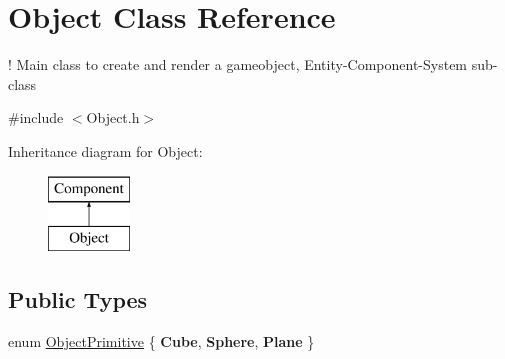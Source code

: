 \hypertarget{class_object}{}\section{Object Class Reference}
\label{class_object}


! Main class to create and render a gameobject, Entity-\/\+Component-\/\+System sub-\/class  




{\ttfamily \#include $<$Object.\+h$>$}

Inheritance diagram for Object\+:\begin{figure}[H]
\begin{center}
\leavevmode
\includegraphics[height=2.000000cm]{class_object}
\end{center}
\end{figure}
\subsection*{Public Types}
\begin{DoxyCompactItemize}
\item 
enum \mbox{\hyperlink{class_object_a0b1996af0cb36adfb3770ca9d3166253}{Object\+Primitive}} \{ {\bfseries Cube}, 
{\bfseries Sphere}, 
{\bfseries Plane}
 \}
\end{DoxyCompactItemize}

